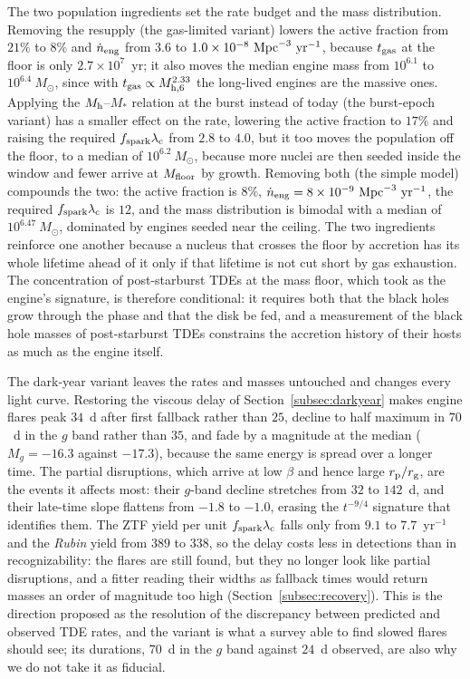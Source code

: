 \documentclass[twocolumn,pdftex]{aastex701}
\newcommand{\msun}{M_{\odot}\xspace}
\newcommand{\mhsix}{M_{\rm h,6}\xspace}
\newcommand{\lsst}{{\it Rubin}\xspace}
\newcommand{\fspark}{f_{\rm spark}\xspace}
\newcommand{\lamc}{\lambda_{\rm c}\xspace}
\begin{document}
The two population ingredients set the rate budget and the mass distribution. Removing the resupply (the gas-limited variant) lowers the active fraction from $21\%$ to $8\%$ and $\dot n_{\rm eng}$ from $3.6$ to $1.0 \times 10^{-8}~{\rm Mpc}^{-3}~{\rm yr}^{-1}$, because $t_{\rm gas}$ at the floor is only $2.7 \times 10^{7}$~yr; it also moves the median engine mass from $10^{6.1}$ to $10^{6.4}~\msun$, since with $t_{\rm gas} \propto \mhsix^{2.33}$ the long-lived engines are the massive ones. Applying the $M_{\rm h}$--$M_\ast$ relation at the burst instead of today (the burst-epoch variant) has a smaller effect on the rate, lowering the active fraction to $17\%$ and raising the required $\fspark \lamc$ from $2.8$ to $4.0$, but it too moves the population off the floor, to a median of $10^{6.2}~\msun$, because more nuclei are then seeded inside the window and fewer arrive at $M_{\rm floor}$ by growth. Removing both (the simple model) compounds the two: the active fraction is $8\%$, $\dot n_{\rm eng} = 8 \times 10^{-9}~{\rm Mpc}^{-3}~{\rm yr}^{-1}$, the required $\fspark \lamc$ is $12$, and the mass distribution is bimodal with a median of $10^{6.47}~\msun$, dominated by engines seeded near the ceiling. The two ingredients reinforce one another because a nucleus that crosses the floor by accretion has its whole lifetime ahead of it only if that lifetime is not cut short by gas exhaustion. The concentration of post-starburst TDEs at the mass floor, which \citet{Guillochon:2026a} took as the engine's signature, is therefore conditional: it requires both that the black holes grow through the phase and that the disk be fed, and a measurement of the black hole masses of post-starburst TDEs constrains the accretion history of their hosts as much as the engine itself.

The dark-year variant leaves the rates and masses untouched and changes every light curve. Restoring the viscous delay of Section~\ref{subsec:darkyear} makes engine flares peak $34$~d after first fallback rather than $25$, decline to half maximum in $70$~d in the $g$ band rather than $35$, and fade by a magnitude at the median ($M_g = -16.3$ against $-17.3$), because the same energy is spread over a longer time. The partial disruptions, which arrive at low $\beta$ and hence large $r_{\rm p}/r_{\rm g}$, are the events it affects most: their $g$-band decline stretches from $32$ to $142$~d, and their late-time slope flattens from $-1.8$ to $-1.0$, erasing the $t^{-9/4}$ signature that identifies them. The ZTF yield per unit $\fspark \lamc$ falls only from $9.1$ to $7.7$~yr$^{-1}$ and the \lsst yield from $389$ to $338$, so the delay costs less in detections than in recognizability: the flares are still found, but they no longer look like partial disruptions, and a fitter reading their widths as fallback times would return masses an order of magnitude too high (Section~\ref{subsec:recovery}). This is the direction \citet{Guillochon:2015a} proposed as the resolution of the discrepancy between predicted and observed TDE rates, and the variant is what a survey able to find slowed flares should see; its durations, $70$~d in the $g$ band against $24$~d observed, are also why we do not take it as fiducial.
\end{document}
